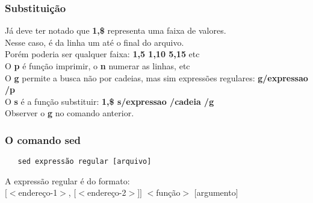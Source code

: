 \documentclass{beamer}
\begin{document}
   \begin{frame}
      \frametitle{Substituição}
      Já deve ter notado que \textbf{1,\$} representa uma faixa de valores. \\
      Nesse caso, é da linha um até o final do arquivo. \\
      Porém poderia ser qualquer faixa: \textbf{1,5 1,10 5,15} etc \\
      O \textbf{p} é função imprimir, o \textbf{n} numerar as linhas, etc \\
      O \textbf{g} permite a busca não por cadeias, mas sim expressões regulares: \textbf{g\slash expressao \slash p} \\
      O \textbf{s} é a função substituir: \textbf{1,\$ s\slash expressao \slash cadeia \slash g} \\
      Observer o \textbf{g} no comando anterior. 
   \end{frame}


\begin{frame}[fragile]
   \frametitle{O comando sed}
   \begin{verbatim}
   sed expressão regular [arquivo]
   \end{verbatim}
   A expressão regular é do formato: \\
   $[<$endereço-1$>$, $[<$endereço-2$>]]$ $<$função$>$ $[$argumento$]$
\end{frame}
\end{document}
